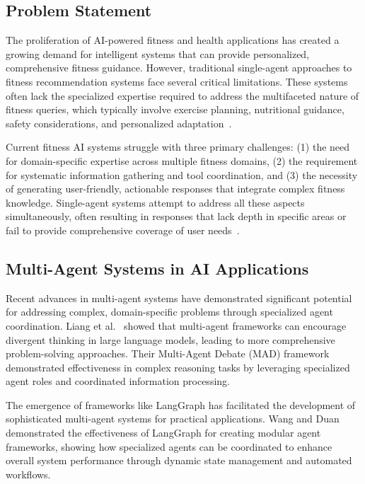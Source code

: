 \documentclass[conference]{IEEEtran}
\begin{document}
\subsection{Problem Statement}

The proliferation of AI-powered fitness and health applications has created a growing demand for intelligent systems that can provide personalized, comprehensive fitness guidance. However, traditional single-agent approaches to fitness recommendation systems face several critical limitations. These systems often lack the specialized expertise required to address the multifaceted nature of fitness queries, which typically involve exercise planning, nutritional guidance, safety considerations, and personalized adaptation~\cite{synatiafit2025, smartfit2024}.

Current fitness AI systems struggle with three primary challenges: (1) the need for domain-specific expertise across multiple fitness domains, (2) the requirement for systematic information gathering and tool coordination, and (3) the necessity of generating user-friendly, actionable responses that integrate complex fitness knowledge. Single-agent systems attempt to address all these aspects simultaneously, often resulting in responses that lack depth in specific areas or fail to provide comprehensive coverage of user needs~\cite{fitnessguide2024}.

\subsection{Multi-Agent Systems in AI Applications}

Recent advances in multi-agent systems have demonstrated significant potential for addressing complex, domain-specific problems through specialized agent coordination. Liang et al.~\cite{multiagentdebate2023} showed that multi-agent frameworks can encourage divergent thinking in large language models, leading to more comprehensive problem-solving approaches. Their Multi-Agent Debate (MAD) framework demonstrated effectiveness in complex reasoning tasks by leveraging specialized agent roles and coordinated information processing.

The emergence of frameworks like LangGraph has facilitated the development of sophisticated multi-agent systems for practical applications. Wang and Duan~\cite{langgraph2024} demonstrated the effectiveness of LangGraph for creating modular agent frameworks, showing how specialized agents can be coordinated to enhance overall system performance through dynamic state management and automated workflows.
\end{document}
